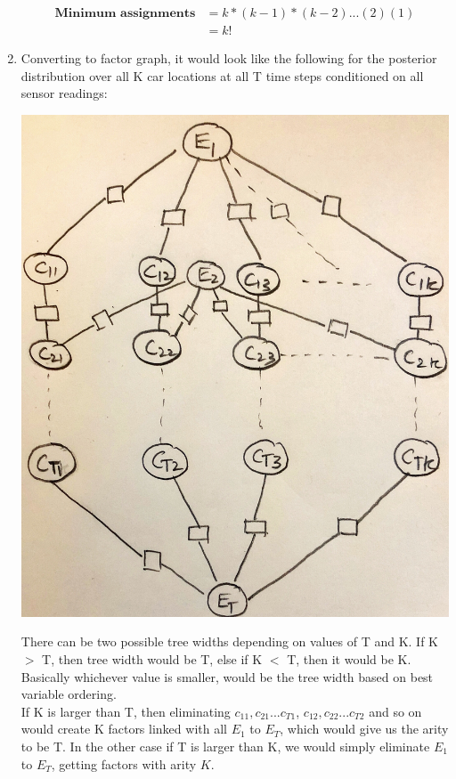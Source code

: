 \documentclass[12pt]{article}
\begin{document}
\begin{enumerate}[label=(\alph*)]
  \begin{align*}
  \textbf{Minimum assignments} &= k * (k-1) * (k-2) ... (2) (1) \\
  &= k!
\end{align*}
\item Converting to factor graph, it would look like the following for the posterior distribution over all K car locations at all T time steps conditioned on all sensor readings:
  \begin{center}
  \includegraphics[scale=0.1]{IMG_2298}
  \end{center}
  There can be two possible tree widths depending on values of T and K. If K $>$ T, then tree width would be T, else if K $<$ T, then it would be K. Basically whichever value is smaller, would be the tree width based on best variable ordering. \\
  If K is larger than T, then eliminating $c_{11}, c_{21} ... c_{T1}$, $c_{12}, c_{22} ... c_{T2}$ and so on would create K factors linked with all $E_1$ to $E_T$, which would give us the arity to be T. In the other case if T is larger than K, we would simply eliminate $E_1$ to $E_T$, getting factors with arity $K$.

\end{enumerate}
\end{document}
